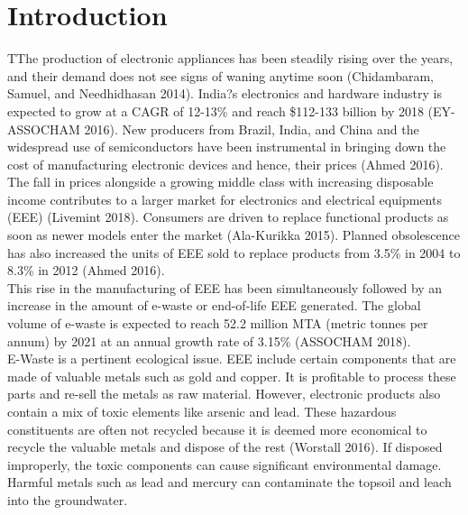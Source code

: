 \documentclass[a4paper, 12pt]{article}
\begin{document}
                    \newpage
                    \section{Introduction}
                    TThe production of electronic appliances has been steadily rising over the years, and their demand does not see signs of waning anytime soon (Chidambaram, Samuel, and Needhidhasan 2014). India?s electronics and hardware industry is expected to grow at a CAGR of 12-13\% and reach \$112-133 billion by 2018 (EY-ASSOCHAM 2016). New producers from Brazil, India, and China and the widespread use of semiconductors have been instrumental in bringing down the cost of manufacturing electronic devices and hence, their prices (Ahmed 2016). \\
                    
                    The fall in prices alongside a growing middle class with increasing disposable income contributes to a larger market for electronics and electrical equipments (EEE) (Livemint 2018). Consumers are driven to replace functional products as soon as newer models enter the market (Ala-Kurikka 2015). Planned obsolescence has also increased the units of EEE sold to replace products from 3.5\% in 2004 to 8.3\% in 2012 (Ahmed 2016).\\
                    
                    This rise in the manufacturing of EEE has been simultaneously followed by an increase in the amount of e-waste or end-of-life EEE generated. The global volume of e-waste is expected to reach 52.2 million MTA (metric tonnes per annum) by 2021 at an annual growth rate of 3.15\% (ASSOCHAM 2018). \\
                    
                    E-Waste is a pertinent ecological issue. EEE include certain components that are made of valuable metals such as gold and copper. It is profitable to process these parts and re-sell the metals as raw material. However, electronic products also contain a mix of toxic elements like arsenic and lead. These hazardous constituents are often not recycled because it is deemed more economical to recycle the valuable metals and dispose of the rest (Worstall 2016). If disposed improperly, the toxic components can cause significant environmental damage. Harmful metals such as lead and mercury can contaminate the topsoil and leach into the groundwater. \\
                    
\end{document}
